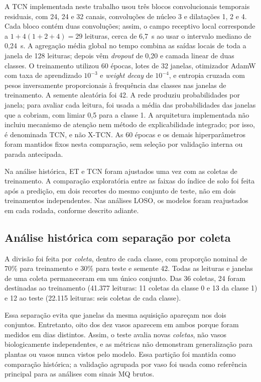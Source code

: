 A TCN implementada neste trabalho usou três blocos convolucionais
temporais residuais, com 24, 24 e 32 canais, convoluções de núcleo 3 e
dilatações 1, 2 e 4. Cada bloco contém duas convoluções; assim, o campo
receptivo local corresponde a $1+4(1+2+4)=29$ leituras, cerca de 6,7~s
ao usar o intervalo mediano de 0,24~s. A agregação média global no tempo
combina as saídas locais de toda a janela de 128 leituras; depois vêm
\emph{dropout} de 0,20 e camada linear de duas classes. O
treinamento utilizou 60 épocas, lotes de 32 janelas, otimizador AdamW com
taxa de aprendizado $10^{-3}$ e \emph{weight decay} de $10^{-4}$, e
entropia cruzada com pesos inversamente proporcionais à frequência das
classes nas janelas de treinamento. A semente aleatória foi 42. A rede
produziu probabilidades por janela; para avaliar cada leitura, foi usada
a média das probabilidades das janelas que a cobriam, com limiar 0,5 para
a classe 1. A arquitetura implementada não incluiu mecanismo de atenção
nem método de explicabilidade integrado; por isso, é denominada TCN, e
não X-TCN. As 60 épocas e os demais hiperparâmetros foram mantidos fixos
nesta comparação, sem seleção por validação interna ou parada antecipada.

Na análise histórica, ET e TCN foram ajustados uma vez com as
coletas de treinamento. A comparação exploratória entre as faixas do índice
de solo foi feita após a predição, em dois recortes do mesmo conjunto de
teste, não em dois treinamentos independentes. Nas análises
LOSO, os modelos foram reajustados em cada rodada, conforme descrito adiante.

\subsection{Análise histórica com separação por coleta}
\label{subsec:treinamento_teste}

A divisão foi feita por \emph{coleta}, dentro de cada classe, com
proporção nominal de 70\% para treinamento e 30\% para teste e semente 42.
Todas as leituras e janelas de uma coleta permaneceram em um único conjunto.
Das 36 coletas, 24 foram destinadas ao treinamento (41.377 leituras: 11
coletas da classe 0 e 13 da classe 1) e 12 ao teste (22.115 leituras:
seis coletas de cada classe).

Essa separação evita que janelas da mesma aquisição apareçam nos dois
conjuntos. Entretanto, oito dos dez vasos aparecem em ambos porque foram
medidos em dias distintos. Assim, o teste avalia novas \emph{coletas}, não vasos
biologicamente independentes, e as métricas não demonstram generalização
para plantas ou vasos nunca vistos pelo modelo. Essa partição foi mantida
como comparação histórica; a validação agrupada por vaso foi usada como
referência principal para as análises com sinais MQ brutos.

